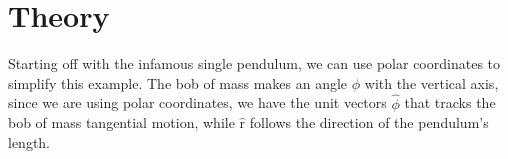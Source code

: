 
\section{Theory}
Starting off with the infamous single pendulum, we can use polar
coordinates to simplify this example.
The bob of mass makes an angle $\phi$ with the vertical axis,
since we are using polar coordinates, we have the unit vectors
$\hat{\phi}$ that tracks the bob of mass tangential motion,
while $\hat{\text{r}}$ follows the direction of the pendulum's
length.
